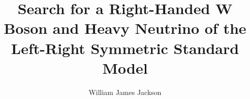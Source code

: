 
\draft

\phd %

%
\title{\bf%
Search for a Right-Handed W Boson and Heavy Neutrino of the Left-Right Symmetric Standard Model%
}
\author{William James Jackson}


\abstract{}

\copyrightpage       %

\acknowledgements{}
\dedication{}


\beforepreface

\figurespage
\tablespage

\afterpreface
